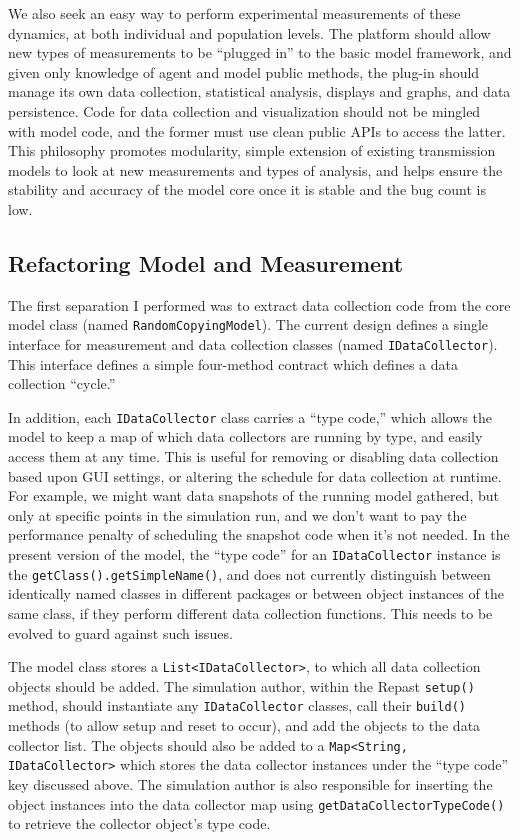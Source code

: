 \documentclass{kluwer-mem-copyright}
\begin{document}
\begin{article}
We also seek an easy way to perform experimental measurements of these dynamics,
at both individual and population levels.  The platform should allow new types
of measurements to be ``plugged in'' to the basic model framework, and given
only knowledge of agent and model public methods, the plug-in should manage its
own data collection, statistical analysis, displays and graphs, and data
persistence.  Code for data collection and visualization should not be mingled
with model code, and the former must use clean public APIs to access the latter.
This philosophy promotes modularity, simple extension of existing transmission
models to look at new measurements and types of analysis, and helps ensure the
stability and accuracy of the model core once it is stable and the bug count is
low. 
\subsection{Refactoring Model and Measurement}
The first separation I performed was to extract data collection code from
the core model class (named \texttt{RandomCopyingModel}).  The current design
defines a single interface for measurement and data collection classes (named
\texttt{IDataCollector}).  This interface defines a simple four-method contract
which defines a data collection ``cycle.''  

In addition, each \texttt{IDataCollector} class carries a ``type code,'' which
allows the model to keep a map of which data collectors are running by type, and
easily access them at any time.  This is useful for removing or disabling data
collection based upon GUI settings, or altering the schedule for data collection
at runtime.  For example, we might want data snapshots of the running model
gathered, but only at specific points in the simulation run, and we don't want
to pay the performance penalty of scheduling the snapshot code when it's not
needed.  In the present version of the model, the ``type code'' for an
\texttt{IDataCollector} instance is the \texttt{getClass().getSimpleName()}, and
does not currently distinguish between identically named classes in different
packages or between object instances of the same class, if they perform
different data collection functions.  This needs to be evolved to guard against
such issues.

The model class stores a 
\texttt{List<IDataCollector>}, to which all data collection objects should be
added.  The simulation author, within the Repast \texttt{setup()} method, 
should instantiate any \texttt{IDataCollector} classes, call
their \texttt{build()} methods (to allow setup and reset to occur), and add the
objects to the data collector list.  The objects should also be added to a
\texttt{Map<String, IDataCollector>} which stores the data collector instances
under the ``type code'' key discussed above.  The simulation author is also
responsible for inserting the object instances into the data collector map using
\texttt{getDataCollectorTypeCode()} to retrieve the collector object's type code. 


\end{article}
\end{document}
